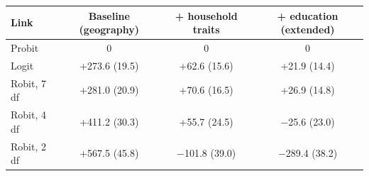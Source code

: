 \footnotesize
\begin{tabular}{lccc}
\toprule
Link & Baseline (geography) & + household traits & + education (extended) \\
\midrule
Probit & 0 & 0 & 0 \\
Logit & +273.6 (19.5) & +62.6 (15.6) & +21.9 (14.4) \\
Robit, 7 df & +281.0 (20.9) & +70.6 (16.5) & +26.9 (14.8) \\
Robit, 4 df & +411.2 (30.3) & +55.7 (24.5) & $-$25.6 (23.0) \\
Robit, 2 df & +567.5 (45.8) & $-$101.8 (39.0) & $-$289.4 (38.2) \\
\bottomrule
\end{tabular}
